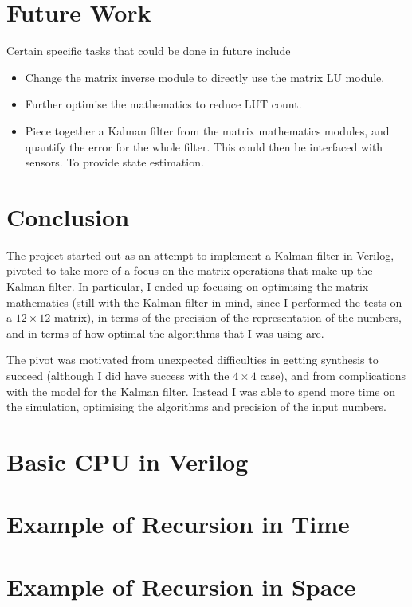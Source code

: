 \documentclass[12pt]{article}
\begin{document}
\section{Future Work}

Certain specific tasks that could be done in future include

\begin{itemize}
	\item Change the matrix inverse module to directly use the matrix LU module.
	\item Further optimise the mathematics to reduce LUT count.
	\item Piece together a Kalman filter from the matrix mathematics modules, and quantify the error for the whole filter. This could then be interfaced with sensors. To provide state estimation.
\end{itemize}

\section{Conclusion}

The project started out as an attempt to implement a Kalman filter in Verilog, pivoted to take more of a focus on the matrix operations that make up the Kalman filter. In particular, I ended up focusing on optimising the matrix mathematics (still with the Kalman filter in mind, since I performed the tests on a $12 \times 12$ matrix), in terms of the precision of the representation of the numbers, and in terms of how optimal the algorithms that I was using are.

The pivot was motivated from unexpected difficulties in getting synthesis to succeed (although I did have success with the $4 \times 4$ case), and from complications with the model for the Kalman filter. Instead I was able to spend more time on the simulation, optimising the algorithms and precision of the input numbers.

\printbibliography

\appendix

\renewcommand{\thesection}{Appendix \Alph{section}}

\section{Basic CPU in Verilog}
\label{verilog_cpu}



\section{Example of Recursion in Time}
\label{recursion_time}



\section{Example of Recursion in Space}
\label{recursion_space}


\end{document}

